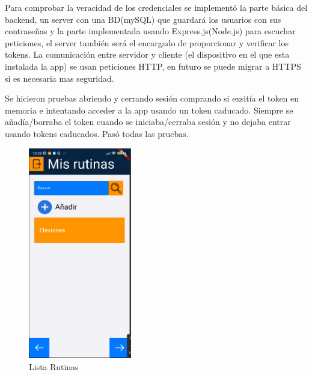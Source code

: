 Para comprobar la veracidad de los credenciales se implementó la parte básica del backend, un server con una BD(mySQL) que guardará los usuarios con sus contraseñas y la parte implementada usando Express.js(Node.js) para escuchar peticiones, el server también será el encargado de proporcionar y verificar los tokens. La comunicación entre servidor y cliente (el dispositivo en el que esta instalada la app) se usan peticiones HTTP, en futuro se puede migrar a HTTPS si es necesaria mas seguridad.

Se hicieron pruebas abriendo y cerrando sesión comprando si exsitía el token en memoria e intentando acceder a la app usando un token caducado. Siempre se añadía/borraba el token cuando se iniciaba/cerraba sesión y no dejaba entrar usando tokens caducados. Pasó todas las pruebas.


\begin{figure}[H]
   \centering
    \includegraphics[width=0.4\textwidth]{pantallas/listaRutinas.png}
    \caption{Lista Rutinas}
    \label{fig:listaRutinas}
\end{figure}

